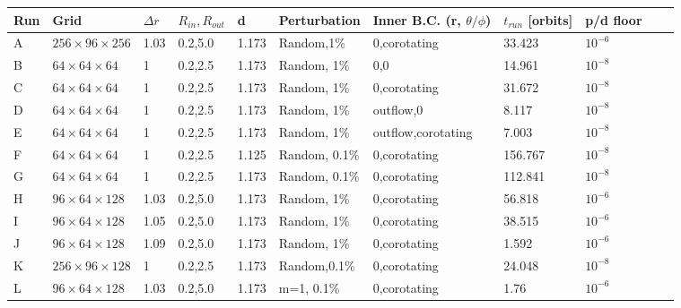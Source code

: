\documentclass[iop,revtex4]{emulateapj}
\begin{document}
\begin{table}[t]
\centering
    \begin{tabular}{lllllllllll}
    \hline
    Run & Grid                   & $\Delta r$ & $R_{in},R_{out}$ & d     & Perturbation & Inner B.C.
(r, $\theta/\phi$) & $t_{run}$ [orbits] & p/d floor \\ \hline
    A & $256\times96\times256$ & 1.03       & 0.2,5.0          & 1.173 & Random,1\%    & 0,corotating                  & 33.423                & $10^{-6}$   \\
    B & $64\times64\times64$   & 1          & 0.2,2.5          & 1.173 & Random, 1\%   & 0,0                           & 14.961             & $10^{-8}$   \\
    C & $64\times64\times64$   & 1          & 0.2,2.5          & 1.173 & Random, 1\%   & 0,corotating                  & 31.672             & $10^{-8}$   \\
    D & $64\times64\times64$   & 1          & 0.2,2.5          & 1.173 & Random, 1\%   & outflow,0                     & 8.117              & $10^{-8}$   \\
    E & $64\times64\times64$   & 1          & 0.2,2.5          & 1.173 & Random, 1\%   & outflow,corotating            & 7.003              & $10^{-8}$   \\
    F & $64\times64\times64$   & 1          & 0.2,2.5          & 1.125 & Random, 0.1\% & 0,corotating                  & 156.767            & $10^{-8}$   \\
    G & $64\times64\times64$   & 1          & 0.2,2.5          & 1.173 & Random, 0.1\% & 0,corotating                  & 112.841            & $10^{-8}$   \\
    H & $96\times64\times128$  & 1.03       & 0.2,5.0          & 1.173 & Random, 1\%   & 0,corotating                  & 56.818             & $10^{-6}$   \\
    I & $96\times64\times128$  & 1.05       & 0.2,5.0          & 1.173 & Random, 1\%   & 0,corotating                  & 38.515             & $10^{-6}$   \\
    J & $96\times64\times128$  & 1.09       & 0.2,5.0          & 1.173 & Random, 1\%   & 0,corotating                  & 1.592              & $10^{-6}$   \\
    K & $256\times96\times128$ & 1          & 0.2,2.5          & 1.173 & Random,0.1\%  & 0,corotating                  & 24.048             & $10^{-8}$   \\ 
     L & $96\times64\times128$  & 1.03       & 0.2,5.0          & 1.173 & m=1, 0.1\%   & 0,corotating                  & 1.76               & $10^{-6}$ \\

\end{tabular}
\end{table}
\end{document}
